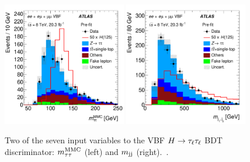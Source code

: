 \begin{figure}[tp]
  \centering
  \includegraphics[width=0.48\textwidth]{figures/HIGG-2013-32/figaux_03c}
  \includegraphics[width=0.48\textwidth]{figures/HIGG-2013-32/figaux_03b}
  \caption{Two of the seven input variables to the VBF $H\rightarrow\tau_\ell\tau_\ell$ BDT discriminator: $m_{\tau\tau}^\text{MMC}$ (left) and $m_{\text{jj}}$ (right).~\cite{HIGG-2013-32}.}
  \label{fig:backgrounds-leplep}
\end{figure}


